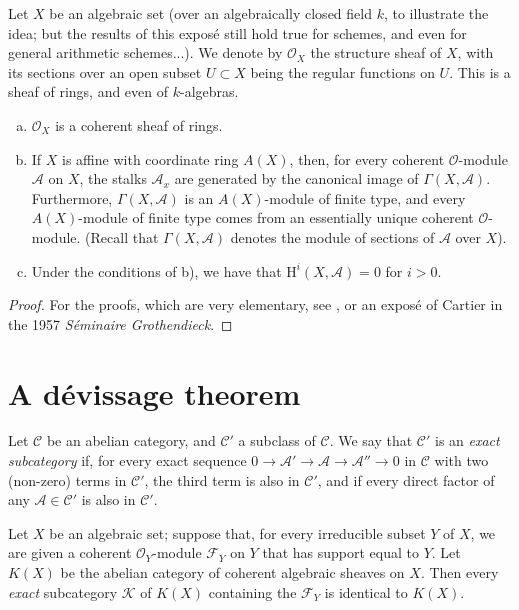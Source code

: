 \documentclass{article}
\theoremstyle{plain}
\newenvironment{theorem}[1]
    {\renewcommand\theinnercustomtheorem{#1}\innercustomtheorem}
    {\endinnercustomtheorem}
\theoremstyle{definition}
\newenvironment{definition}[1]
    {\renewcommand\theinnercustomdefinition{#1}\innercustomdefinition}
    {\endinnercustomdefinition}
\newcommand{\sh}[1]{{\mathscr{#1}}}
\newcommand{\cat}[1]{{\mathcal{#1}}}
\newcommand{\HH}{\mathrm{H}}
\newcommand{\oldpage}[1]{\marginpar{\footnotesize$\Big\vert$ \textit{p.~#1}}}
\begin{document}
Let $X$ be an algebraic set (over an algebraically closed field $k$, to illustrate the idea; but the results of this expos\'{e} still hold true for schemes, and even for general arithmetic schemes...).
We denote by $\sh{O}_X$ the structure sheaf of $X$, with its sections over an open subset $U\subset X$ being the regular functions on $U$.
This is a sheaf of rings, and even of $k$-algebras.

\begin{theorem}{1}
\label{theorem1}
\begin{enumerate}[(a)]
  \item $\sh{O}_X$ is a coherent sheaf of rings.
  \item If $X$ is affine with coordinate ring $A(X)$, then, for every coherent $\sh{O}$-module $\sh{A}$ on $X$, the stalks $\sh{A}_x$ are generated by the canonical image of $\Gamma(X,\sh{A})$.
    Furthermore, $\Gamma(X,\sh{A})$ is an $A(X)$-module of finite type, and every $A(X)$-module of finite type comes from an essentially unique coherent $\sh{O}$-module.
    (Recall that $\Gamma(X,\sh{A})$ denotes the module of sections of $\sh{A}$ over $X$).
  \item Under the conditions of b), we have that $\HH^i(X,\sh{A})=0$ for $i>0$.
\oldpage{2-02}
\end{enumerate}
\end{theorem}

\begin{proof}
  For the proofs, which are very elementary, see \cite[chapitre~2, paragraphes~2,3,4]{1}, or an expos\'{e} of Cartier in the 1957 \emph{S\'{e}minaire Grothendieck}.
\end{proof}


\section{A d\'{e}vissage theorem}
\label{section2}

\begin{definition}{1}
\label{definition1}
  Let $\cat{C}$ be an abelian category, and $\cat{C}'$ a subclass of $\cat{C}$.
  We say that $\cat{C}'$ is an \emph{exact subcategory} if, for every exact sequence $0\to\sh{A}'\to\sh{A}\to\sh{A}''\to0$ in $\cat{C}$ with two (non-zero) terms in $\cat{C}'$, the third term is also in $\cat{C}'$, and if every direct factor of any $\sh{A}\in\cat{C}'$ is also in $\cat{C}'$.
\end{definition}

\begin{theorem}{2}
\label{theorem2}
  Let $X$ be an algebraic set;
  suppose that, for every irreducible subset $Y$ of $X$, we are given a coherent $\sh{O}_Y$-module $\sh{F}_Y$ on $Y$ that has support equal to $Y$.
  Let $K(X)$ be the abelian category of coherent algebraic sheaves on $X$.
  Then every \emph{exact} subcategory $\cat{K}$ of $K(X)$ containing the $\sh{F}_Y$ is identical to $K(X)$.
\end{theorem}
\end{document}
